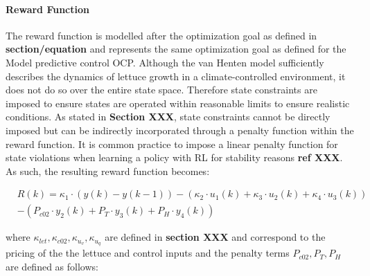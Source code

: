 \paragraph{Reward Function}
\label{paragraph:reward-function}
The reward function is modelled after the optimization goal as defined in \textbf{section/equation} and represents the same optimization goal as defined for the Model predictive control OCP. Although the van Henten model sufficiently describes the dynamics of lettuce growth in a climate-controlled environment, it does not do so over the entire state space. Therefore state constraints are imposed to ensure states are operated within reasonable limits to ensure realistic conditions. As stated in \textbf{Section XXX}, state constraints cannot be directly imposed but can be indirectly incorporated through a penalty function within the reward function. It is common practice to impose a linear penalty function for state violations when learning a policy with RL for stability reasons \textbf{ref XXX}. As such, the resulting reward function becomes:

\begin{equation}\label{eq:reward_fn}
    \begin{aligned}
        & R(k)  = \kappa_{1} \cdot (y(k)- y(k-1)) - (\kappa_{2} \cdot u_1(k) + \kappa_{3} \cdot u_2(k) + \kappa_{4} \cdot u_3(k))  \\ 
        & - (P_{c02} \cdot y_2(k) + P_T \cdot y_3(k) + P_H \cdot y_4(k))
    \end{aligned}
\end{equation}

where $\kappa_{let},\kappa_{c02},\kappa_{u_v},\kappa_{u_q}$ are defined in \textbf{section XXX} and correspond to the pricing of the the lettuce and control inputs
and the penalty terms $P_{c02},P_T,P_H$ are defined as follows:

